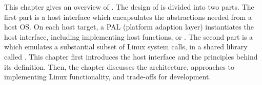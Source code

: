 This chapter gives an overview of \graphene{}.
The design of \graphene{} is divided into two parts.
The first part is a host interface which encapsulates the abstractions needed from a host OS.
On each host target, a PAL (platform adaption layer) instantiates the host interface,
including implementing \palcallnum{} host functions, or \hostapis{}.
The second part is a \libos{} which emulates a substantial subset of Linux system calls,
in a shared library called \thelibos{}.
This chapter first introduces the host interface and the principles behind its definition.
Then, the chapter discusses the \libos{} architecture,
approaches to implementing Linux functionality,
and trade-offs
for \libos{} development.


